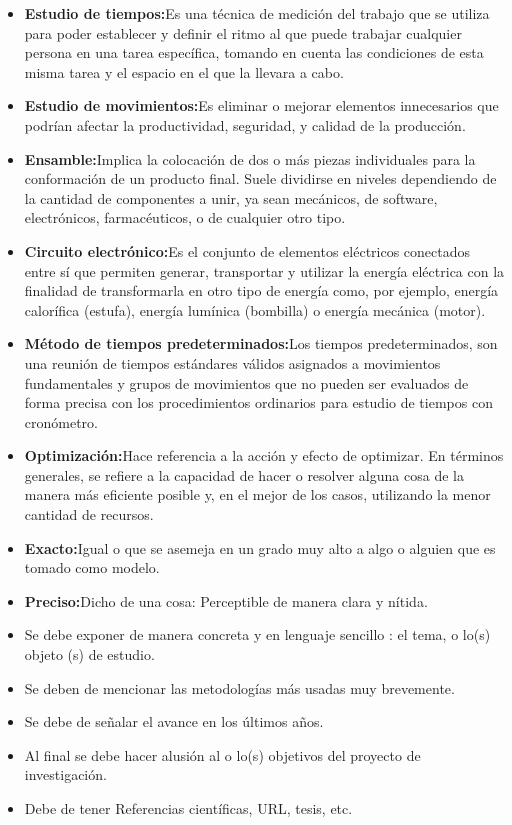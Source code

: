     \begin{itemize}
        \item\textbf{Estudio de tiempos:}Es una técnica de medición del trabajo que se utiliza para poder establecer y definir el ritmo al que puede trabajar cualquier persona en una tarea específica, tomando en cuenta las condiciones de esta misma tarea y el espacio en el que la llevara a cabo. \cite{Estudiodetiempos}
         \item\textbf{Estudio de movimientos:}Es eliminar o mejorar elementos innecesarios que podrían afectar la productividad, seguridad, y calidad de la producción. \cite{Estudiodemovimientos}
        \item\textbf{Ensamble:}Implica la colocación de dos o más piezas individuales para la conformación de un producto final. Suele dividirse en niveles dependiendo de la cantidad de componentes a unir, ya sean mecánicos, de software, electrónicos, farmacéuticos, o de cualquier otro tipo. \cite{Ensamble}
        \item\textbf{Circuito electrónico:}Es el conjunto de elementos eléctricos conectados entre sí que permiten generar, transportar y utilizar la energía eléctrica con la finalidad de transformarla en otro tipo de energía como, por ejemplo, energía calorífica (estufa), energía lumínica (bombilla) o energía mecánica (motor). \cite{Circuitoelectrico}
        \item\textbf{Método de tiempos predeterminados:}Los tiempos predeterminados, son una reunión de tiempos estándares válidos asignados a movimientos fundamentales y grupos de movimientos que no pueden ser evaluados de forma precisa con los procedimientos ordinarios para estudio de tiempos con cronómetro. \cite{Tiempospredeterminados}
        \item\textbf{Optimización:}Hace referencia a la acción y efecto de optimizar. En términos generales, se refiere a la capacidad de hacer o resolver alguna cosa de la manera más eficiente posible y, en el mejor de los casos, utilizando la menor cantidad de recursos. \cite{optimizacion}
         \item\textbf{Exacto:}Igual o que se asemeja en un grado muy alto a algo o alguien que es tomado como modelo. \cite{Exacto}
         \item\textbf{Preciso:}Dicho de una cosa: Perceptible de manera clara y nítida. \cite{Preciso}
        
        
        \item Se debe exponer de manera concreta y en lenguaje sencillo : el tema, o lo(s) objeto (s) de estudio. 
        \item Se deben de mencionar las metodologías más usadas muy brevemente. 
        \item Se debe de señalar el avance en los últimos años.
        \item Al final se debe hacer alusión al o lo(s) objetivos del proyecto de investigación.
        \item Debe de tener Referencias científicas, URL, tesis, etc.
    \end{itemize}
